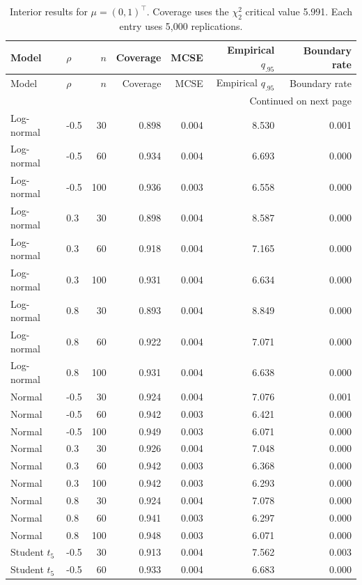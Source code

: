 \documentclass[11pt]{article}
\theoremstyle{remark}
\begin{document}
\begin{longtable}{llrrrrr}
\caption{Interior results for $\mu=(0,1)^\top$. Coverage uses the $\chi^2_2$ critical value 5.991. Each entry uses 5,000 replications.}\label{tab:interior-full}\\
\toprule
Model & $\rho$ & $n$ & Coverage & MCSE & Empirical $q_{.95}$ & Boundary rate \\
\midrule
\endfirsthead
\toprule
Model & $\rho$ & $n$ & Coverage & MCSE & Empirical $q_{.95}$ & Boundary rate \\
\midrule
\endhead
\midrule
\multicolumn{7}{r}{Continued on next page}\\
\endfoot
\bottomrule
\endlastfoot
Log-normal & -0.5 & 30 & 0.898 & 0.004 & 8.530 & 0.001 \\
Log-normal & -0.5 & 60 & 0.934 & 0.004 & 6.693 & 0.000 \\
Log-normal & -0.5 & 100 & 0.936 & 0.003 & 6.558 & 0.000 \\
Log-normal & 0.3 & 30 & 0.898 & 0.004 & 8.587 & 0.000 \\
Log-normal & 0.3 & 60 & 0.918 & 0.004 & 7.165 & 0.000 \\
Log-normal & 0.3 & 100 & 0.931 & 0.004 & 6.634 & 0.000 \\
Log-normal & 0.8 & 30 & 0.893 & 0.004 & 8.849 & 0.000 \\
Log-normal & 0.8 & 60 & 0.922 & 0.004 & 7.071 & 0.000 \\
Log-normal & 0.8 & 100 & 0.931 & 0.004 & 6.638 & 0.000 \\
Normal & -0.5 & 30 & 0.924 & 0.004 & 7.076 & 0.001 \\
Normal & -0.5 & 60 & 0.942 & 0.003 & 6.421 & 0.000 \\
Normal & -0.5 & 100 & 0.949 & 0.003 & 6.071 & 0.000 \\
Normal & 0.3 & 30 & 0.926 & 0.004 & 7.048 & 0.000 \\
Normal & 0.3 & 60 & 0.942 & 0.003 & 6.368 & 0.000 \\
Normal & 0.3 & 100 & 0.942 & 0.003 & 6.293 & 0.000 \\
Normal & 0.8 & 30 & 0.924 & 0.004 & 7.078 & 0.000 \\
Normal & 0.8 & 60 & 0.941 & 0.003 & 6.297 & 0.000 \\
Normal & 0.8 & 100 & 0.948 & 0.003 & 6.071 & 0.000 \\
Student $t_5$ & -0.5 & 30 & 0.913 & 0.004 & 7.562 & 0.003 \\
Student $t_5$ & -0.5 & 60 & 0.933 & 0.004 & 6.683 & 0.000 \\

\end{longtable}
\end{document}
